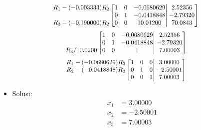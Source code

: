 \documentclass[pdflatex,compress,mathserif]{beamer}
\newcommand*{\Scale}[2][4]{\scalebox{#1}{$#2$}}%
\begin{document}
\begin{frame}
	\[
	\Scale[0.9]{
		\begin{matrix}
		R_1 - (-0.003333)R_2\\
		\\
		R_3 - (-0.190000)R_2
		\end{matrix}
		\left[
		\begin{matrix}
		1 & 0 & -0.0680629 \\
		0 & 1 & -0.0418848 \\
		0 & 0 & 10.01200
		\end{matrix}
		\right|
		\left.
		\begin{matrix}
		2.52356 \\ -2.79320 \\ 70.0843
		\end{matrix}
		\right]
	}
	\]
	\[
	\Scale[0.9]{
		\begin{matrix}
		\\
		\\
		R_3 /10.0200\\
		\end{matrix}
		\left[
		\begin{matrix}
		1 & 0 & -0.0680629 \\
		0 & 1 & -0.0418848 \\
		0 & 0 & 1
		\end{matrix}
		\right|
		\left.
		\begin{matrix}
		2.52356 \\ -2.79320 \\ 7.00003
		\end{matrix}
		\right]
	}
	\]
	\[
	\Scale[0.9]{
		\begin{matrix}
		R_1 - (-0.0680629) R_3\\
		R_2 - (-0.0418848) R_2\\
		\\
		\end{matrix}
		\left[
		\begin{matrix}
		1 & 0 & 0 \\
		0 & 1 & 0 \\
		0 & 0 & 1
		\end{matrix}
		\right|
		\left.
		\begin{matrix}
		3.00000 \\ -2.50001 \\ 7.00003
		\end{matrix}
		\right]
	}
	\]
	\begin{itemize}
		\item Solusi:
		\begin{align*}
			x_1 &= 3.00000 \\
			x_2 &= -2.50001 \\
			x_3 &= 7.00003
		\end{align*}
	\end{itemize}
\end{frame}
\end{document}
